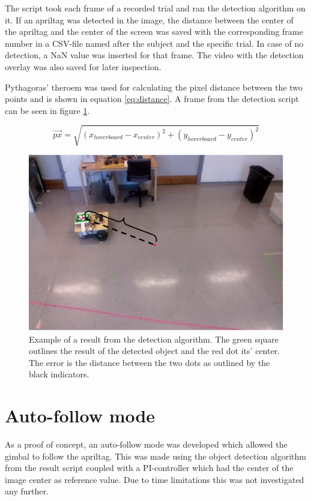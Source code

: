 \documentclass[nofilelist]{cslthse-msc}
\begin{document}
The script took each frame of a recorded trial and ran the detection algorithm on it. If an apriltag was detected in the image, the distance between the center of the apriltag and the center of the screen was saved with the corresponding frame number in a CSV-file named after the subject and the specific trial. In case of no detection, a NaN value was inserted for that frame. The video with the detection overlay was also saved for later inspection.

Pythagoras' theroem was used for calculating the pixel distance between the two points and is shown in equation \ref{eq:distance}. A frame from the detection script can be seen in figure \ref{fig:resultcalc}.

\begin{equation}
   \label{eq:distance}
   \overrightarrow{px} = \sqrt{(x_{hoverboard} - x_{center})^2 + (y_{hoverboard} - y_{center})^2}
\end{equation}


\begin{figure}[!hbt]
   \centering
   \includegraphics[scale=0.3]{images/resultcalc.png} 
   \caption{Example of a result from the detection algorithm. The green square outlines the result of the detected object and the red dot its' center. The error is the distance between the two dots as outlined by the black indicators.}
   \label{fig:resultcalc}
\end{figure}

\section{Auto-follow mode}
As a proof of concept, an auto-follow mode was developed which allowed the gimbal to follow the apriltag. This was made using the object detection algorithm from the result script coupled with a PI-controller which had the center of the image center as reference value. Due to time limitations this was not investigated any further.
\end{document}
